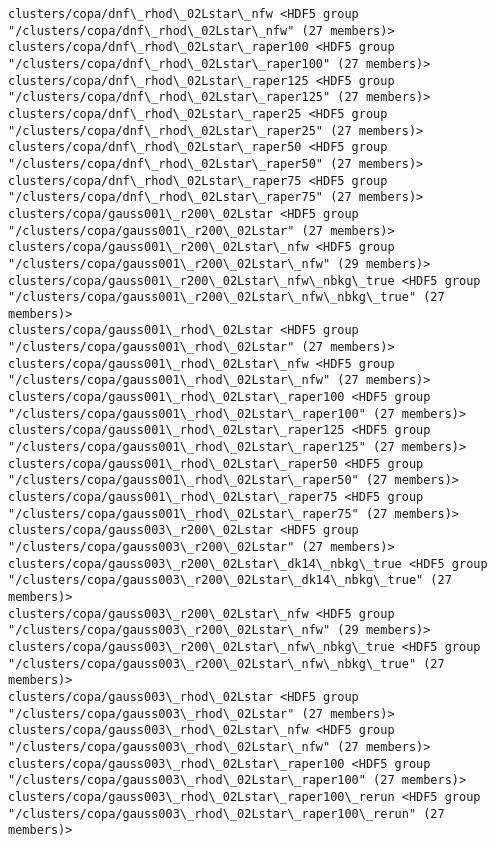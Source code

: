 \documentclass[11pt]{article}
\begin{document}
\begin{Verbatim}[commandchars=\\\{\}]
clusters/copa/dnf\_rhod\_02Lstar\_nfw <HDF5 group "/clusters/copa/dnf\_rhod\_02Lstar\_nfw" (27 members)>
clusters/copa/dnf\_rhod\_02Lstar\_raper100 <HDF5 group "/clusters/copa/dnf\_rhod\_02Lstar\_raper100" (27 members)>
clusters/copa/dnf\_rhod\_02Lstar\_raper125 <HDF5 group "/clusters/copa/dnf\_rhod\_02Lstar\_raper125" (27 members)>
clusters/copa/dnf\_rhod\_02Lstar\_raper25 <HDF5 group "/clusters/copa/dnf\_rhod\_02Lstar\_raper25" (27 members)>
clusters/copa/dnf\_rhod\_02Lstar\_raper50 <HDF5 group "/clusters/copa/dnf\_rhod\_02Lstar\_raper50" (27 members)>
clusters/copa/dnf\_rhod\_02Lstar\_raper75 <HDF5 group "/clusters/copa/dnf\_rhod\_02Lstar\_raper75" (27 members)>
clusters/copa/gauss001\_r200\_02Lstar <HDF5 group "/clusters/copa/gauss001\_r200\_02Lstar" (27 members)>
clusters/copa/gauss001\_r200\_02Lstar\_nfw <HDF5 group "/clusters/copa/gauss001\_r200\_02Lstar\_nfw" (29 members)>
clusters/copa/gauss001\_r200\_02Lstar\_nfw\_nbkg\_true <HDF5 group "/clusters/copa/gauss001\_r200\_02Lstar\_nfw\_nbkg\_true" (27 members)>
clusters/copa/gauss001\_rhod\_02Lstar <HDF5 group "/clusters/copa/gauss001\_rhod\_02Lstar" (27 members)>
clusters/copa/gauss001\_rhod\_02Lstar\_nfw <HDF5 group "/clusters/copa/gauss001\_rhod\_02Lstar\_nfw" (27 members)>
clusters/copa/gauss001\_rhod\_02Lstar\_raper100 <HDF5 group "/clusters/copa/gauss001\_rhod\_02Lstar\_raper100" (27 members)>
clusters/copa/gauss001\_rhod\_02Lstar\_raper125 <HDF5 group "/clusters/copa/gauss001\_rhod\_02Lstar\_raper125" (27 members)>
clusters/copa/gauss001\_rhod\_02Lstar\_raper50 <HDF5 group "/clusters/copa/gauss001\_rhod\_02Lstar\_raper50" (27 members)>
clusters/copa/gauss001\_rhod\_02Lstar\_raper75 <HDF5 group "/clusters/copa/gauss001\_rhod\_02Lstar\_raper75" (27 members)>
clusters/copa/gauss003\_r200\_02Lstar <HDF5 group "/clusters/copa/gauss003\_r200\_02Lstar" (27 members)>
clusters/copa/gauss003\_r200\_02Lstar\_dk14\_nbkg\_true <HDF5 group "/clusters/copa/gauss003\_r200\_02Lstar\_dk14\_nbkg\_true" (27 members)>
clusters/copa/gauss003\_r200\_02Lstar\_nfw <HDF5 group "/clusters/copa/gauss003\_r200\_02Lstar\_nfw" (29 members)>
clusters/copa/gauss003\_r200\_02Lstar\_nfw\_nbkg\_true <HDF5 group "/clusters/copa/gauss003\_r200\_02Lstar\_nfw\_nbkg\_true" (27 members)>
clusters/copa/gauss003\_rhod\_02Lstar <HDF5 group "/clusters/copa/gauss003\_rhod\_02Lstar" (27 members)>
clusters/copa/gauss003\_rhod\_02Lstar\_nfw <HDF5 group "/clusters/copa/gauss003\_rhod\_02Lstar\_nfw" (27 members)>
clusters/copa/gauss003\_rhod\_02Lstar\_raper100 <HDF5 group "/clusters/copa/gauss003\_rhod\_02Lstar\_raper100" (27 members)>
clusters/copa/gauss003\_rhod\_02Lstar\_raper100\_rerun <HDF5 group "/clusters/copa/gauss003\_rhod\_02Lstar\_raper100\_rerun" (27 members)>

\end{Verbatim}
\end{document}
